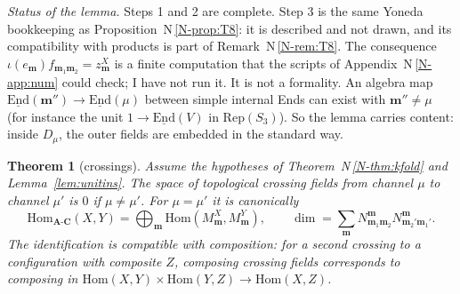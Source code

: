 \documentclass[11pt]{article}
\newtheorem{theorem}{Theorem}[section]
\theoremstyle{definition}
\theoremstyle{remark}
\newcommand{\bfA}{\mathbf A}
\newcommand{\bfC}{\mathbf C}
\newcommand{\nref}[1]{N\,\ref{N-#1}}
\begin{document}
\emph{Status of the lemma.} Steps 1 and 2 are complete. Step 3 is the same Yoneda bookkeeping as Proposition~\nref{prop:T8}: it is described and not drawn, and its compatibility with products is part of Remark~\nref{rem:T8}. The consequence $\iota(e_{\mathbf m})f_{\mathbf m_1\mathbf m_2}=z^X_{\mathbf m}$ is a finite computation that the scripts of Appendix~\nref{app:num} could check; I have not run it. It is not a formality. An algebra map $\underline{\mathrm{End}}(\mathbf m'')\to\underline{\mathrm{End}}(\mu)$ between simple internal Ends can exist with $\mathbf m''\neq\mu$ (for instance the unit $1\to\underline{\mathrm{End}}(V)$ in $\mathrm{Rep}(S_3)$). So the lemma carries content: inside $D_\mu$, the outer fields are embedded in the standard way.

\begin{theorem}[crossings]\label{thm:crossing}
Assume the hypotheses of Theorem~\nref{thm:kfold} and Lemma~\ref{lem:unitins}. The space of topological crossing fields from channel $\mu$ to channel $\mu'$ is $0$ if $\mu\neq\mu'$. For $\mu=\mu'$ it is canonically
\[
\mathrm{Hom}_{\bfA\text{-}\bfC}(X,Y)=\bigoplus_{\mathbf m}\mathrm{Hom}(M^X_{\mathbf m},M^Y_{\mathbf m}),\qquad \dim=\sum_{\mathbf m}N^{\mathbf m}_{\mathbf m_1\mathbf m_2}N^{\mathbf m}_{\mathbf m_2'\mathbf m_1'}.
\]
The identification is compatible with composition: for a second crossing to a configuration with composite $Z$, composing crossing fields corresponds to composing in $\mathrm{Hom}(X,Y)\times\mathrm{Hom}(Y,Z)\to\mathrm{Hom}(X,Z)$.
\end{theorem}
\end{document}
